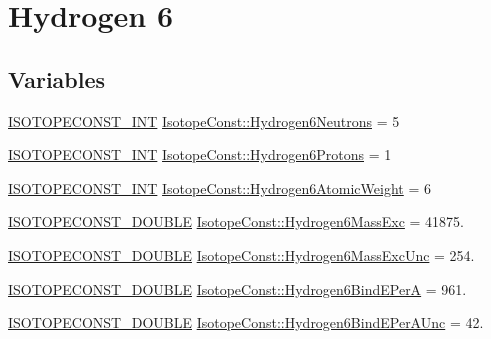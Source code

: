 \hypertarget{group___isotope_const-_hydrogen-_h6}{}\section{Hydrogen 6}
\label{group___isotope_const-_hydrogen-_h6}
\subsection*{Variables}
\begin{DoxyCompactItemize}
\item 
\mbox{\hyperlink{group___isotope_const-_macros_ga5f18360b3e99483a35c32d789e62621c}{I\+S\+O\+T\+O\+P\+E\+C\+O\+N\+S\+T\+\_\+\+I\+NT}} \mbox{\hyperlink{group___isotope_const-_hydrogen-_h6_ga7074562a919d652fcc5ea42767de80e9}{Isotope\+Const\+::\+Hydrogen6\+Neutrons}} = 5
\item 
\mbox{\hyperlink{group___isotope_const-_macros_ga5f18360b3e99483a35c32d789e62621c}{I\+S\+O\+T\+O\+P\+E\+C\+O\+N\+S\+T\+\_\+\+I\+NT}} \mbox{\hyperlink{group___isotope_const-_hydrogen-_h6_ga81f0b2b2103ec98c3fd107dc158bfbbe}{Isotope\+Const\+::\+Hydrogen6\+Protons}} = 1
\item 
\mbox{\hyperlink{group___isotope_const-_macros_ga5f18360b3e99483a35c32d789e62621c}{I\+S\+O\+T\+O\+P\+E\+C\+O\+N\+S\+T\+\_\+\+I\+NT}} \mbox{\hyperlink{group___isotope_const-_hydrogen-_h6_ga1e76f5e22a68a438b5c225215588635b}{Isotope\+Const\+::\+Hydrogen6\+Atomic\+Weight}} = 6
\item 
\mbox{\hyperlink{group___isotope_const-_macros_ga8f45a7272ce02c0b4c65c44636ed719a}{I\+S\+O\+T\+O\+P\+E\+C\+O\+N\+S\+T\+\_\+\+D\+O\+U\+B\+LE}} \mbox{\hyperlink{group___isotope_const-_hydrogen-_h6_ga28e9629ed4e4145fa25c03fb87c70530}{Isotope\+Const\+::\+Hydrogen6\+Mass\+Exc}} = 41875.
\item 
\mbox{\hyperlink{group___isotope_const-_macros_ga8f45a7272ce02c0b4c65c44636ed719a}{I\+S\+O\+T\+O\+P\+E\+C\+O\+N\+S\+T\+\_\+\+D\+O\+U\+B\+LE}} \mbox{\hyperlink{group___isotope_const-_hydrogen-_h6_gafd7d4669aa95f8855d706d37982ef06b}{Isotope\+Const\+::\+Hydrogen6\+Mass\+Exc\+Unc}} = 254.
\item 
\mbox{\hyperlink{group___isotope_const-_macros_ga8f45a7272ce02c0b4c65c44636ed719a}{I\+S\+O\+T\+O\+P\+E\+C\+O\+N\+S\+T\+\_\+\+D\+O\+U\+B\+LE}} \mbox{\hyperlink{group___isotope_const-_hydrogen-_h6_ga4d5c3c30c2a82620c9f2f8bba6f78c35}{Isotope\+Const\+::\+Hydrogen6\+Bind\+E\+PerA}} = 961.
\item 
\mbox{\hyperlink{group___isotope_const-_macros_ga8f45a7272ce02c0b4c65c44636ed719a}{I\+S\+O\+T\+O\+P\+E\+C\+O\+N\+S\+T\+\_\+\+D\+O\+U\+B\+LE}} \mbox{\hyperlink{group___isotope_const-_hydrogen-_h6_gadff32349e71dfd9a1f253e8fe53f6044}{Isotope\+Const\+::\+Hydrogen6\+Bind\+E\+Per\+A\+Unc}} = 42.

\end{DoxyCompactItemize}
